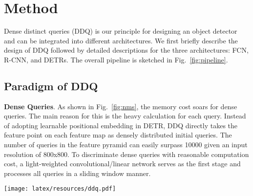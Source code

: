 \documentclass[10pt,twocolumn,letterpaper]{article}
\begin{document}
\section{Method}

Dense distinct queries (DDQ) is our principle for designing an object detector and can be integrated into different architectures. We first briefly describe the design of DDQ followed by detailed descriptions for the three architectures: FCN, R-CNN, and DETRs. The overall pipeline is sketched in Fig.~\ref{fig:pipeline}. 

\subsection{Paradigm of DDQ} 
\label{sec:method}
\noindent\textbf{Dense Queries}. As shown in Fig.~\ref{fig:nms}, the memory cost soars for dense queries. The main reason for this is the heavy calculation for each query. Instead of adopting learnable positional embedding in DETR, DDQ directly takes the feature point on each feature map as densely distributed initial queries. The number of queries in the feature pyramid can easily surpass 10000 given an input resolution of 800x800. 
To discriminate dense queries with reasonable computation cost, a light-weighted convolutional/linear network serves as the first stage and processes all queries in a sliding window manner.\\

 \begin{figure*}[t]
    \centering
    \texttt{[image: latex/resources/ddq.pdf]}
      \caption{
    \textbf{The pipeline of DDQ}. (a) shows the application of DDQ to an FCOS-like structure, which is a fully-convolutional network (FCN). It is thus dubbed \textbf{DDQ FCN}. The pyramid shuffle is applied to the last two and last convolution layers in the classification and regression branches, respectively. The class-agnostic NMS act as the distinct queries selection operation. At last, only distinct queries will be assigned labels before calculating loss. (b) shows the design of DDQ for R-CNN structures (DDQ R-CNN). The last feature maps of the classification and regression branches of DDQ FCN are concatenated and filtered as distinct queries. The distinct queries are then sent to the refining heads with their corresponding bounding boxes. (c) shows the design of DDQ for DETRs  (DDQ DETR). After distinct queries selection, the remaining feature embedding in the encoder is projected with a linear to the content part of distinct queries. Their corresponding bounding boxes will be mapped to the position embedding part. Both parts will be sent to 6 refine stages. In such a long refine architecture, DQS will be applied before each refine stage to ensure distinctness.}
    
    \label{fig:pipeline}
    \vspace{-3mm}
\end{figure*}
\end{document}
